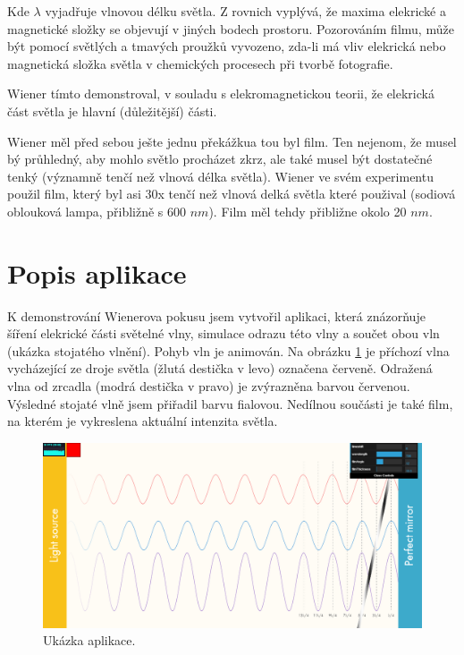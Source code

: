 \documentclass[12pt,a4paper,titlepage,final]{report}
\begin{document}
Kde $\lambda$ vyjadřuje vlnovou délku světla. Z rovnich vyplývá, že
maxima elekrické a magnetické složky se objevují v jiných bodech prostoru. Pozorováním filmu, může být pomocí světlých a tmavých proužků vyvozeno, zda-li má vliv elekrická nebo magnetická složka světla v chemických procesech při tvorbě fotografie.

Wiener tímto demonstroval, v souladu s elekromagnetickou teorii, že elekrická část světla je hlavní (důležitější) části.

Wiener měl před sebou ješte jednu překážkua tou byl film. Ten nejenom, že musel bý průhledný, aby mohlo světlo procházet zkrz, ale také musel být dostatečné tenký (významně tenčí než vlnová délka světla).
Wiener ve svém experimentu použil film, který byl asi 30x tenčí než 
vlnová delká světla které použival (sodiová oblouková lampa, přibližně s 600 $nm$). Film měl tehdy přibližne okolo 20 $nm$.

\section{Popis aplikace}
K demonstrování Wienerova pokusu jsem vytvořil aplikaci, která znázorňuje šíření elekrické části světelné vlny, simulace odrazu této vlny a 
součet obou vln (ukázka stojatého vlnění). Pohyb vln je animován. Na obrázku \ref{fig:aplikace} je příchozí vlna vycházející
ze droje světla (žlutá destička v levo) označena červeně. Odražená vlna od zrcadla (modrá destička v pravo) je zvýrazněna barvou červenou.
Výsledné stojaté vlně jsem přiřadil barvu fialovou. Nedílnou součásti je také film, na kterém je vykreslena aktuální intenzita světla.

\begin{figure}[!htb]
   \centering
 	\includegraphics[width=\textwidth]{aplikace}
   \caption{Ukázka aplikace.}
   \label{fig:aplikace}
\end{figure}
\end{document}
